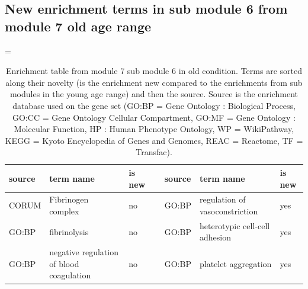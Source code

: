 \clearpage
\subsection{New enrichment terms in sub module 6 from module 7 old age range}
\label{supp:supp_sub_cluster_6_enrich_table}

\LTcapwidth=\textwidth
\begin{longtable}{@{}lp{4cm}lllp{4cm}l@{}}
\caption[Enrichment table from module 7 sub module 6 in old condition]{Enrichment table from module 7 sub module 6 in old condition. Terms are sorted along their novelty (is the enrichment new compared to the enrichments from sub modules in the young age range) and then the source. Source is the enrichment database used on the gene set (GO:BP = Gene Ontology : Biological Process, GO:CC = Gene Ontology Cellular Compartment, GO:MF = Gene Ontology : Molecular Function, HP : Human Phenotype Ontology, WP = WikiPathway, KEGG = Kyoto Encyclopedia of Genes and Genomes, REAC = Reactome, TF = Transfac).}
\\ \hline
\textbf{source} & \textbf{term name}                                                                                                                & \textbf{is new} & \textbf{} & \textbf{source} & \textbf{term name}                                                                                                                                                    & \textbf{is new} \\ \hline
CORUM           & Fibrinogen complex                                                                                                                 & no               &           & GO:BP           & regulation of vasoconstriction                                                                                                                                         & yes              \\
GO:BP           & fibrinolysis                                                                                                                       & no               &           & GO:BP           & heterotypic cell-cell adhesion                                                                                                                                         & yes              \\
GO:BP           & negative regulation of blood coagulation                                                                                           & no               &           & GO:BP           & platelet aggregation                                                                                                                                                   & yes              \\

\end{longtable}
